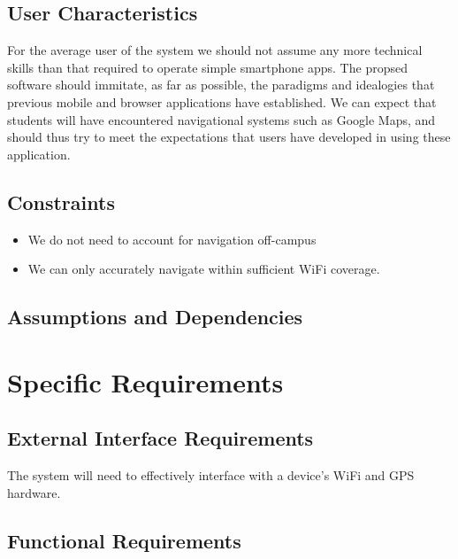 \documentclass[10pt,a4paper]{article}
\begin{document}
		\subsection{User Characteristics}

			For the average user of the system we should not assume any more technical
			skills than that required to operate simple smartphone apps. The propsed
			software should immitate, as far as possible, the paradigms and idealogies
			that previous mobile and browser applications have established. We can
			expect that students will have encountered navigational systems such as
			Google Maps, and should thus try to meet the expectations that users have
			developed in using these application.

		\subsection{Constraints}

			\begin{itemize}

				\item We do not need to account for navigation off-campus
				\item We can only accurately navigate within sufficient WiFi coverage.

			\end{itemize}

		\subsection{Assumptions and Dependencies}



	\section{Specific Requirements}

		\subsection{External Interface Requirements}

			The system will need to effectively interface with a device's WiFi and GPS
			hardware.

		\subsection{Functional Requirements}
\end{document}
